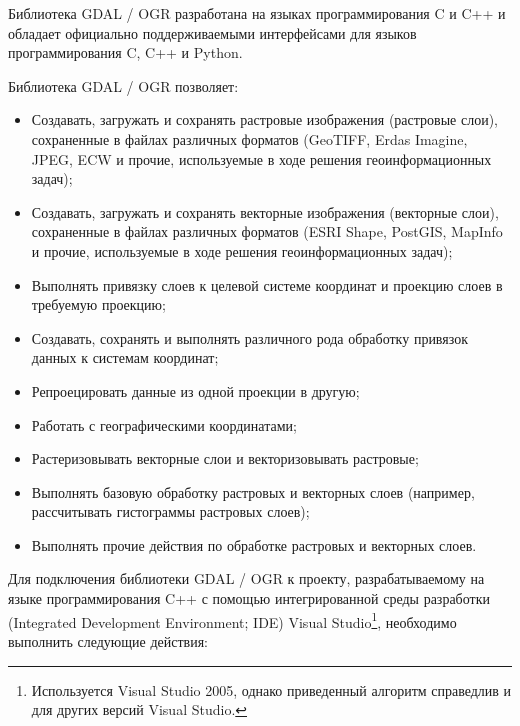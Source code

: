 Библиотека GDAL / OGR разработана на языках программирования C и C++ и обладает официально поддерживаемыми интерфейсами для языков программирования C, C++ и Python.

Библиотека GDAL / OGR позволяет:

\begin{itemize}

	\item Создавать, загружать и сохранять растровые изображения (растровые слои), сохраненные в файлах различных форматов (GeoTIFF, Erdas Imagine, JPEG, ECW и прочие, используемые в ходе решения геоинформационных задач);
	\item Создавать, загружать и сохранять векторные изображения (векторные слои), сохраненные в файлах различных форматов (ESRI Shape, PostGIS, MapInfo и прочие, используемые в ходе решения геоинформационных задач);
	\item Выполнять привязку слоев к целевой системе координат и проекцию слоев в требуемую проекцию;
	\item Создавать, сохранять и выполнять различного рода обработку привязок данных к системам координат;
	\item Репроецировать данные из одной проекции в другую;
	\item Работать с географическими координатами;
	\item Растеризовывать векторные слои и векторизовывать растровые;
	\item Выполнять базовую обработку растровых и векторных слоев (например, рассчитывать гистограммы растровых слоев);
	\item Выполнять прочие действия по обработке растровых и векторных слоев.

\end{itemize}


Для подключения библиотеки GDAL / OGR к проекту, разрабатываемому на языке программирования C++ с помощью интегрированной среды разработки (Integrated Development Environment; IDE) Visual Studio\footnote{Используется Visual Studio 2005, однако приведенный алгоритм справедлив и для других версий Visual Studio.}, необходимо выполнить следующие действия:


